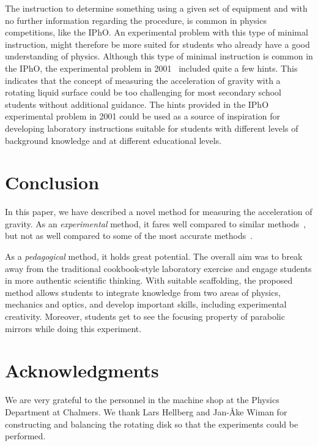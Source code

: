 \documentclass[11pt, a4paper, twocolumn, swedish, english]{article}
\begin{document}
The instruction to determine something using a given set of equipment
and with no further information regarding the procedure, is common in
physics competitions, like the IPhO. An experimental problem with this
type of minimal instruction, might therefore be more suited for
students who already have a good understanding of physics. Although
this type of minimal instruction is common in the IPhO, the
experimental problem in 2001~\cite{IPhO2001} included quite a few
hints. This indicates that the concept of measuring the acceleration
of gravity with a rotating liquid surface could be too challenging for
most secondary school students without additional guidance. The hints
provided in the IPhO experimental problem in 2001 could be used as a
source of inspiration for developing laboratory instructions suitable
for students with different levels of background knowledge and at
different educational levels. 

\section{Conclusion}

In this paper, we have described a novel method for measuring the acceleration of gravity. 
As an \emph{experimental} method, it fares well compared to similar methods~\cite{IPhO2001}, 
but not as well compared to some of the most accurate methods~\cite{Candela2001}. 

As a \emph{pedagogical} method, it holds great potential. 
The overall aim was to break away from the traditional cookbook-style laboratory exercise and engage students in more 
authentic scientific thinking. With suitable scaffolding,
the proposed method allows students to integrate knowledge from two areas of physics, mechanics and optics,
and develop important skills, including experimental creativity. 
Moreover, students get to see the focusing property of parabolic mirrors while doing this experiment.

\section*{Acknowledgments}

We are very grateful to the personnel in the machine shop at the
Physics Department at Chalmers. We thank Lars Hellberg and Jan-Åke
Wiman for constructing and balancing the rotating disk so that the
experiments could be performed. 



\end{document}
